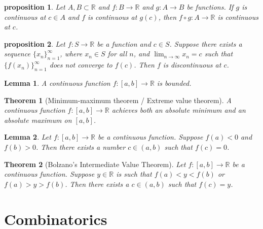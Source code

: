 \documentclass{article}
\newtheorem{theorem}{Theorem}[section]
\newtheorem{lemma}{Lemma}[section]
\newtheorem{proposition}{Proposition}[section]
\newtheorem{proposition}{proposition}[section]
\theoremstyle{definition}
\theoremstyle{remark}
\begin{document}
\begin{proposition}
Let $A, B \subset \mathbb{R}$ and $f : B \to \mathbb{R}$ and $g : A \to B$ be functions. If $g$ is continuous at $c \in A$ and $f$ is continuous at $g(c)$, then $f \circ g: A \to \mathbb{R}$ is continuous at $c$.
\end{proposition}

\begin{proposition}
Let $f : S \to \mathbb{R}$ be a function and $c \in S$. Suppose there exists a sequence $\{x_n\}_{n=1}^{\infty}$, where $x_n \in S$ for all $n$, and $\lim_{n\to\infty} x_n = c$ such that $\{f(x_n)\}_{n=1}^{\infty}$ does not converge to $f(c)$. Then $f$ is discontinuous at $c$.
\end{proposition}

\begin{lemma}
A continuous function $f : [a,b] \to \mathbb{R}$ is bounded.
\end{lemma}

\begin{theorem}[Minimum-maximum theorem / Extreme value theorem]
A continuous function $f : [a,b] \to \mathbb{R}$ achieves both an absolute minimum and an absolute maximum on $[a,b]$.
\end{theorem}

\begin{lemma}
Let $f : [a,b] \to \mathbb{R}$ be a continuous function. Suppose $f(a) < 0$ and $f(b) > 0$. Then there exists a number $c \in (a,b)$ such that $f(c) = 0$.
\end{lemma}

\begin{theorem}[Bolzano's Intermediate Value Theorem]
Let $f : [a,b] \to \mathbb{R}$ be a continuous function. Suppose $y \in \mathbb{R}$ is such that $f(a) < y < f(b)$ or $f(a) > y > f(b)$. Then there exists a $c \in (a,b)$ such that $f(c) = y$.
\end{theorem}



















\section{Combinatorics}
\end{document}
